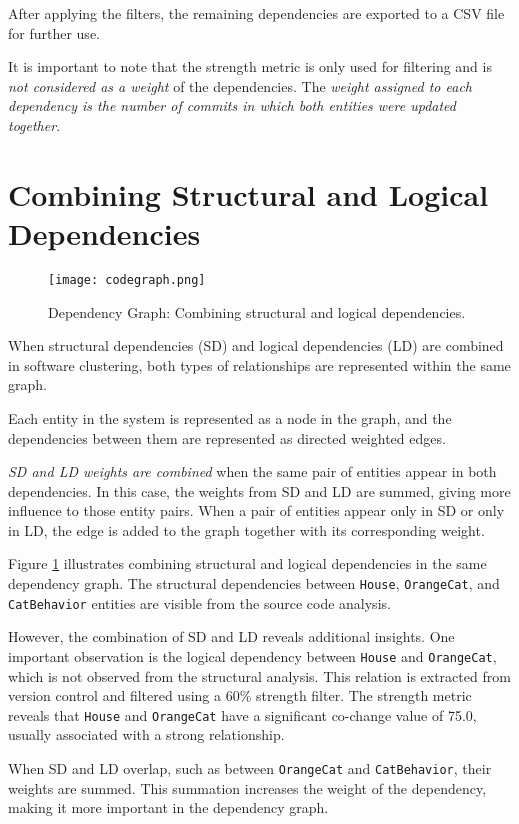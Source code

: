 After applying the filters, the remaining dependencies are exported to a CSV file for further use.

It is important to note that the strength metric is only used for filtering and is \textit{not considered as a weight} of the dependencies. The \textit{weight assigned to each dependency is the number of commits in which both entities were updated together}.


\section{Combining Structural and Logical Dependencies}


\begin{figure}[t!]
  \centering
  \texttt{[image: codegraph.png]}
  \caption{Dependency Graph: Combining structural and logical dependencies.}
  \label{fig:codegraph}
\end{figure}

When structural dependencies (SD) and logical dependencies (LD) are combined in software clustering, both types of relationships are represented within the same graph.

Each entity in the system is represented as a node in the graph, and the dependencies between them are represented as directed weighted edges.

\textit{SD and LD weights are combined} when the same pair of entities appear in both dependencies. In this case, the weights from SD and LD are summed, giving more influence to those entity pairs. When a pair of entities appear only in SD or only in LD, the edge is added to the graph together with its corresponding weight.

Figure \ref{fig:codegraph} illustrates combining structural and logical dependencies in the same dependency graph. The structural dependencies between \texttt{House}, \texttt{OrangeCat}, and \texttt{CatBehavior} entities are visible from the source code analysis.

However, the combination of SD and LD reveals additional insights. One important observation is the logical dependency between \texttt{House} and \texttt{OrangeCat}, which is not observed from the structural analysis. This relation is extracted from version control and filtered using a 60\% strength filter. The strength metric reveals that \texttt{House} and \texttt{OrangeCat} have a significant co-change value of 75.0, usually associated with a strong relationship.

When SD and LD overlap, such as between \texttt{OrangeCat} and \texttt{CatBehavior}, their weights are summed. This summation increases the weight of the dependency, making it more important in the dependency graph.




